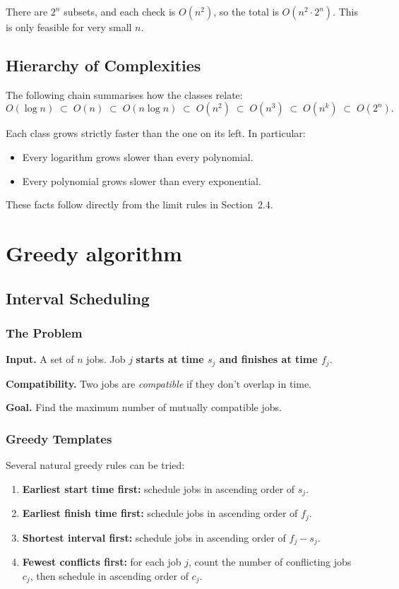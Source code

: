 \documentclass[12pt,a4paper]{report}
\begin{document}
There are $2^n$ subsets, and each check is $O(n^2)$, so the total is $O(n^2 \cdot 2^n)$.
This is only feasible for very small $n$.

\section{Hierarchy of Complexities}

The following chain summarises how the classes relate:
\[
    O(\log n) \;\subset\; O(n) \;\subset\; O(n \log n) \;\subset\; O(n^2)
    \;\subset\; O(n^3) \;\subset\; O(n^k) \;\subset\; O(2^n).
\]

Each class grows strictly faster than the one on its left. In particular:
\begin{itemize}
    \item Every logarithm grows slower than every polynomial.
    \item Every polynomial grows slower than every exponential.
\end{itemize}

These facts follow directly from the limit rules in Section~2.4.
\chapter{Greedy algorithm}
\section{Interval Scheduling}

\subsection{The Problem}

\textbf{Input.} A set of $n$ jobs. Job $j$ \textbf{ starts at time $s_j$ and finishes at time $f_j$}.

\textbf{Compatibility.} Two jobs are \emph{compatible} if they don't overlap in time.

\textbf{Goal.} Find the maximum number of mutually compatible jobs.

\subsection{Greedy Templates}

Several natural greedy rules can be tried:

\begin{enumerate}
    \item \textbf{Earliest start time first:} schedule jobs in ascending order of $s_j$.
    \item \textbf{Earliest finish time first:} schedule jobs in ascending order of $f_j$.
    \item \textbf{Shortest interval first:} schedule jobs in ascending order of $f_j - s_j$.
    \item \textbf{Fewest conflicts first:} for each job $j$, count the number of conflicting
    jobs $c_j$, then schedule in ascending order of $c_j$.
\end{enumerate}
\end{document}
